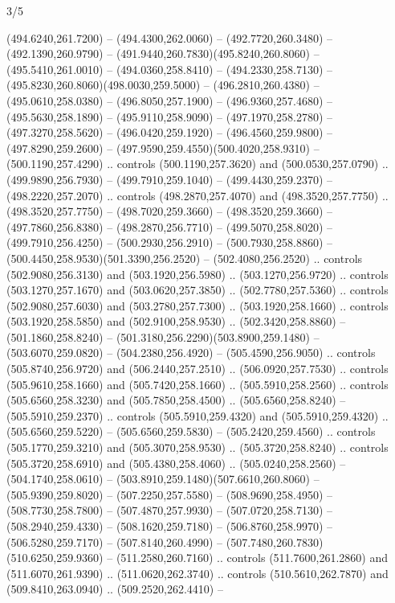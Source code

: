 \begin{flagdescription}{3/5}
\begin{scope}[shift={(0.5\flaglength,0.5\flagwidth)},scale=\flagwidth/1075]
\begin{scope}[y=0.80pt, x=0.80pt, yscale=-2.37, xscale=2.37,xshift=-402,yshift=-230.4]
  (494.6240,261.7200) -- (494.4300,262.0060) -- (492.7720,260.3480) --
  (492.1390,260.9790) -- (491.9440,260.7830)(495.8240,260.8060) --
  (495.5410,261.0010) -- (494.0360,258.8410) -- (494.2330,258.7130) --
  (495.8230,260.8060)(498.0030,259.5000) -- (496.2810,260.4380) --
  (495.0610,258.0380) -- (496.8050,257.1900) -- (496.9360,257.4680) --
  (495.5630,258.1890) -- (495.9110,258.9090) -- (497.1970,258.2780) --
  (497.3270,258.5620) -- (496.0420,259.1920) -- (496.4560,259.9800) --
  (497.8290,259.2600) -- (497.9590,259.4550)(500.4020,258.9310) --
  (500.1190,257.4290) .. controls (500.1190,257.3620) and (500.0530,257.0790) ..
  (499.9890,256.7930) -- (499.7910,259.1040) -- (499.4430,259.2370) --
  (498.2220,257.2070) .. controls (498.2870,257.4070) and (498.3520,257.7750) ..
  (498.3520,257.7750) -- (498.7020,259.3660) -- (498.3520,259.3660) --
  (497.7860,256.8380) -- (498.2870,256.7710) -- (499.5070,258.8020) --
  (499.7910,256.4250) -- (500.2930,256.2910) -- (500.7930,258.8860) --
  (500.4450,258.9530)(501.3390,256.2520) -- (502.4080,256.2520) .. controls
  (502.9080,256.3130) and (503.1920,256.5980) .. (503.1270,256.9720) .. controls
  (503.1270,257.1670) and (503.0620,257.3850) .. (502.7780,257.5360) .. controls
  (502.9080,257.6030) and (503.2780,257.7300) .. (503.1920,258.1660) .. controls
  (503.1920,258.5850) and (502.9100,258.9530) .. (502.3420,258.8860) --
  (501.1860,258.8240) -- (501.3180,256.2290)(503.8900,259.1480) --
  (503.6070,259.0820) -- (504.2380,256.4920) -- (505.4590,256.9050) .. controls
  (505.8740,256.9720) and (506.2440,257.2510) .. (506.0920,257.7530) .. controls
  (505.9610,258.1660) and (505.7420,258.1660) .. (505.5910,258.2560) .. controls
  (505.6560,258.3230) and (505.7850,258.4500) .. (505.6560,258.8240) --
  (505.5910,259.2370) .. controls (505.5910,259.4320) and (505.5910,259.4320) ..
  (505.6560,259.5220) -- (505.6560,259.5830) -- (505.2420,259.4560) .. controls
  (505.1770,259.3210) and (505.3070,258.9530) .. (505.3720,258.8240) .. controls
  (505.3720,258.6910) and (505.4380,258.4060) .. (505.0240,258.2560) --
  (504.1740,258.0610) -- (503.8910,259.1480)(507.6610,260.8060) --
  (505.9390,259.8020) -- (507.2250,257.5580) -- (508.9690,258.4950) --
  (508.7730,258.7800) -- (507.4870,257.9930) -- (507.0720,258.7130) --
  (508.2940,259.4330) -- (508.1620,259.7180) -- (506.8760,258.9970) --
  (506.5280,259.7170) -- (507.8140,260.4990) --
  (507.7480,260.7830)(510.6250,259.9360) -- (511.2580,260.7160) .. controls
  (511.7600,261.2860) and (511.6070,261.9390) .. (511.0620,262.3740) .. controls
  (510.5610,262.7870) and (509.8410,263.0940) .. (509.2520,262.4410) --

\end{scope}
\end{scope}
\end{flagdescription}
